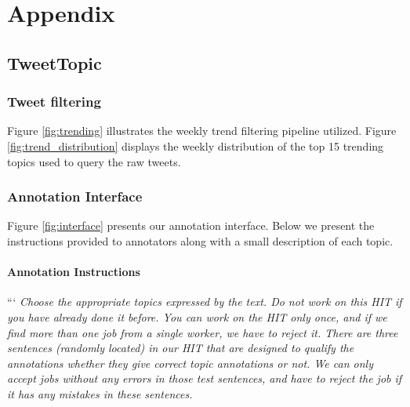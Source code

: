 \setlength{\headheight}{15pt} %
\chapter{Appendix} 
\label{ch:appendix} 

\section{TweetTopic}\label{appendix:TweetTopic}
\subsection{Tweet filtering}\label{appendix:TweetTopic-filtering}
Figure \ref{fig:trending} illustrates the weekly trend filtering pipeline utilized.
Figure \ref{fig:trend_distribution} displays the weekly distribution of the top 15 trending topics used to query the raw tweets. 

\subsection{Annotation Interface}\label{appendix:TweetTopic-annotation}
\label{sec:annotationinterface}
Figure \ref{fig:interface} presents our annotation interface. Below we present the instructions provided to annotators along with a small description of each topic.%


\subsubsection*{Annotation Instructions}
\label{sec:appendix:tweet-topic-instructions}
```
\textit{Choose the appropriate topics expressed by the text. Do not work on this HIT if you have already done it before. You can work on the HIT only once, and if we find more than one job from a single worker, we have to reject it. There are three sentences (randomly located) in our HIT that are designed to qualify the annotations whether they give correct topic annotations or not. We can only accept jobs without any errors in those test sentences, and have to reject the job if it has any mistakes in these sentences.}

\medskip


